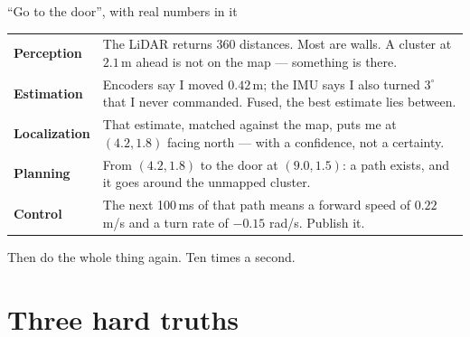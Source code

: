 \documentclass[aspectratio=169]{beamer}
\begin{document}
\begin{frame}{``Go to the door'', with real numbers in it}
  \small
  \begin{table}
  \begin{tabular}{@{}p{1.9cm}p{8.9cm}@{}}
    \toprule
    \textbf{Perception} & The LiDAR returns 360 distances. Most are walls. A cluster at
      $2.1$\,m ahead is not on the map --- something is there. \\[0.3em]
    \textbf{Estimation} & Encoders say I moved $0.42$\,m; the IMU says I also turned
      $3^\circ$ that I never commanded. Fused, the best estimate lies between. \\[0.3em]
    \textbf{Localization} & That estimate, matched against the map, puts me at
      $(4.2, 1.8)$ facing north --- with a confidence, not a certainty. \\[0.3em]
    \textbf{Planning} & From $(4.2, 1.8)$ to the door at $(9.0, 1.5)$: a path exists, and it
      goes around the unmapped cluster. \\[0.3em]
    \textbf{Control} & The next 100\,ms of that path means a forward speed of
      $0.22$ m/s and a turn rate of $-0.15$ rad/s. Publish it. \\
    \bottomrule
  \end{tabular}
  \end{table}

  \vspace{0.2em}
  \centering Then do the whole thing again. Ten times a second.
\end{frame}

\section{Three hard truths}
\end{document}
